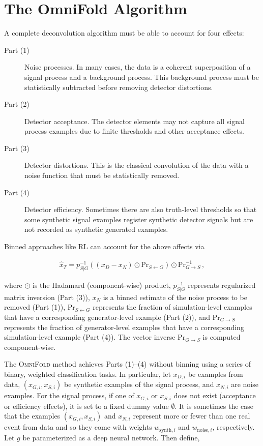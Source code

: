 \documentclass{article} %
\begin{document}
\section{The OmniFold Algorithm}
\label{sec:algorithm}

A complete deconvolution algorithm must be able to account for four effects:

\begin{description}
	\item[Part (1)] Noise processes.  In many cases, the data is a coherent superposition of a signal process and a background process.  This background process must be statistically subtracted before removing detector distortions.
	\item[Part (2)] Detector acceptance.  The detector elements may not capture all signal process examples due to finite thresholds and other acceptance effects.  
	\item[Part (3)] Detector distortions.  This is the classical convolution of the data with a noise function that must be statistically removed.
	\item[Part (4)] Detector efficiency.  Sometimes there are also truth-level thresholds so that some synthetic signal examples register synthetic detector signals but are not recorded as synthetic generated examples.
\end{description}

Binned approaches like RL can account for the above affects via 

\begin{align}
\hat{x}_T=p_{S|G}^{-1}\left((x_D-x_N)\odot \text{Pr}_{S\leftarrow G}\right)\odot \text{Pr}_{G\rightarrow S}^{-1}\,,
\end{align}

 where $\odot$ is the Hadamard (component-wise) product, $p_{S|G}^{-1}$ represents regularized matrix inversion (Part (3)), $x_N$ is a binned estimate of the noise process to be removed (Part (1)), $\text{Pr}_{S\leftarrow G}$ represents the fraction of simulation-level examples that have a corresponding generator-level example (Part (2)), and $\text{Pr}_{G\rightarrow S}$ represents the fraction of generator-level examples that have a corresponding simulation-level example (Part (4)).  The vector inverse $\text{Pr}_{G\rightarrow S}$ is computed component-wise.
 
 The \textsc{OmniFold} method achieves Parts (1)--(4) without binning using a series of binary, weighted classification tasks.  In particular, let $x_{D,i}$ be examples from data, $(x_{G,i},x_{S,i})$ be synthetic examples of the signal process, and $x_{N,i}$ are noise examples.  For the signal process, if one of $x_{G,i}$ or $x_{S,i}$ does not exist (acceptance or efficiency effects), it is set to a fixed dummy value $\emptyset$.  It is sometimes the case that the examples $(x_{G,i},x_{S,i})$ and $x_{N,i}$ represent more or fewer than one real event from data and so they come with weights $w_{\text{synth},i}$ and $w_{\text{noise},i}$, respectively. Let $g$ be parameterized as a deep neural network.  Then define,
\end{document}
